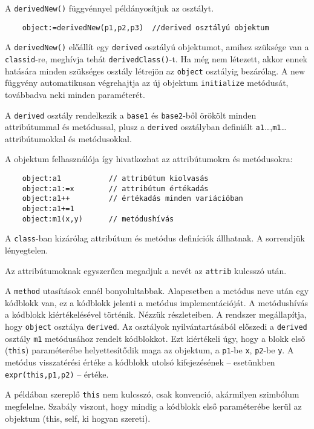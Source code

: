 A \verb!derivedNew()! függvénnyel példányosítjuk az osztályt. 
\begin{verbatim}
    object:=derivedNew(p1,p2,p3)  //derived osztályú objektum
\end{verbatim}
A \verb!derivedNew()! előállít egy \verb!derived! osztályú objektumot, 
amihez szüksége van a \verb!classid!-re, meghívja tehát \verb!derivedClass()!-t.
Ha még nem létezett, akkor ennek hatására minden szükséges osztály létrejön 
az \verb!object! osztályig bezárólag.
A new függvény automatikusan végrehajtja az új objektum \verb!initialize! 
metódusát, továbbadva neki minden paraméterét.



A \verb!derived! osztály rendelkezik a
\verb!base1! és \verb!base2!-ből örökölt minden attribútummal és metódussal, 
plusz a \verb!derived! osztályban definiált \verb!a1!\ldots,\verb!m1!\ldots  
attribútumokkal és metódusokkal.

A objektum felhasználója így hivatkozhat az attribútumokra és metódusokra:
\begin{verbatim}
    object:a1           // attribútum kiolvasás
    object:a1:=x        // attribútum értékadás
    object:a1++         // értékadás minden variációban
    object:a1+=1
    object:m1(x,y)      // metódushívás
\end{verbatim}

A \verb!class!-ban kizárólag attribútum és metódus definíciók állhatnak.
A sorrendjük lényegtelen.

Az attribútumoknak egyszerűen megadjuk a nevét az \verb!attrib! kulcsszó után. 

A \verb!method! utasítások ennél bonyolultabbak.
Alapesetben a metódus neve után egy kódblokk van,
ez a kódblokk jelenti a metódus implementációját.
A metódushívás a kódblokk kiértékelésével történik.
Nézzük részleteiben. 
A rendszer megállapítja, hogy \verb!object! osztálya \verb!derived!.
Az osztályok nyilvántartásából
előszedi a \verb!derived! osztály \verb!m1! metódusához rendelt
kódblokkot. Ezt kiértékeli úgy, hogy a blokk első (\verb!this!) paraméterébe
helyettesítődik maga az objektum, a \verb!p1!-be \verb!x!, \verb!p2!-be \verb!y!.
A metódus visszatérési értéke a kódblokk utolsó kifejezésének --
esetünkben \verb!expr(this,p1,p2)! -- értéke. 

A példában szereplő
\verb!this! nem kulcsszó, csak konvenció, akármilyen szimbólum megfelelne.
Szabály viszont, hogy mindig a kódblokk első paraméterébe kerül az 
objektum (this, self, ki hogyan szereti).


